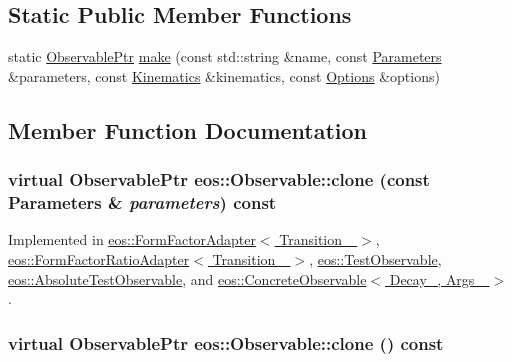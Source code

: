 \subsection*{Static Public Member Functions}
\begin{DoxyCompactItemize}
\item 
static \hyperlink{namespaceeos_a470e5dd806bd129080f1aa0c2954646f}{ObservablePtr} \hyperlink{classeos_1_1Observable_a949bf84938bcc9ab75075801c636763c}{make} (const std::string \&name, const \hyperlink{classeos_1_1Parameters}{Parameters} \&parameters, const \hyperlink{classeos_1_1Kinematics}{Kinematics} \&kinematics, const \hyperlink{classeos_1_1Options}{Options} \&options)
\end{DoxyCompactItemize}


\subsection{Member Function Documentation}
\hypertarget{classeos_1_1Observable_a20e8218d04aa5589ce795ddd425751a0}{
\subsubsection[{clone}]{\setlength{\rightskip}{0pt plus 5cm}virtual {\bf ObservablePtr} eos::Observable::clone (const {\bf Parameters} \& {\em parameters}) const}}
\label{classeos_1_1Observable_a20e8218d04aa5589ce795ddd425751a0}


Implemented in \hyperlink{classeos_1_1FormFactorAdapter_a94fdbd805aef594f074e6999616505b5}{eos::FormFactorAdapter$<$ Transition\_\- $>$}, \hyperlink{classeos_1_1FormFactorRatioAdapter_ad8de46a9cedc903bfe0beecbbf66dc58}{eos::FormFactorRatioAdapter$<$ Transition\_\- $>$}, \hyperlink{structeos_1_1TestObservable_a40b0831f486d5a73e583becb0c6c9da4}{eos::TestObservable}, \hyperlink{structeos_1_1AbsoluteTestObservable_af0a14d774c083598130b3062f956c4c9}{eos::AbsoluteTestObservable}, and \hyperlink{classeos_1_1ConcreteObservable_afe63f75a6814eda8dca5d1e842f71fc6}{eos::ConcreteObservable$<$ Decay\_\-, Args\_\- $>$}.\hypertarget{classeos_1_1Observable_a1c88c66a224a14fbddad70e95cb61136}{
\subsubsection[{clone}]{\setlength{\rightskip}{0pt plus 5cm}virtual {\bf ObservablePtr} eos::Observable::clone () const}}
\label{classeos_1_1Observable_a1c88c66a224a14fbddad70e95cb61136}


